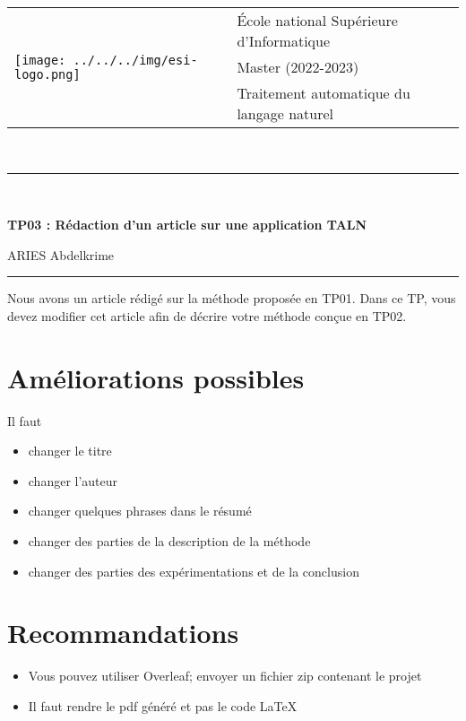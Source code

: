 \documentclass[11pt, a4paper]{article}
\begin{document}

\noindent
\begin{tabular}{ll}
\multirow{3}{*}{\texttt{[image: ../../../img/esi-logo.png]}} & \'Ecole national Supérieure d'Informatique\\
& Master (2022-2023) \\
& Traitement automatique du langage naturel
\end{tabular}\\[.25cm]
\noindent\rule{\textwidth}{1pt}\\%
\begin{center}
{\LARGE \textbf{TP03 : Rédaction d'un article sur une application TALN}}
\begin{flushright}
	ARIES Abdelkrime
\end{flushright}
\end{center}
\noindent\rule{\textwidth}{1pt}

Nous avons un article rédigé sur la méthode proposée en TP01.
Dans ce TP, vous devez modifier cet article afin de décrire votre méthode conçue en TP02.


\section{Améliorations possibles}

Il faut 
\begin{itemize}
	\item changer le titre
	\item changer l'auteur
	\item changer quelques phrases dans le résumé
	\item changer des parties de la description de la méthode 
	\item changer des parties des expérimentations et de la conclusion
\end{itemize}

\section{Recommandations}

\begin{itemize}
	\item Vous pouvez utiliser Overleaf; envoyer un fichier zip contenant le projet
	\item Il faut rendre le pdf généré et pas le code \LaTeX
\end{itemize}
\end{document}
